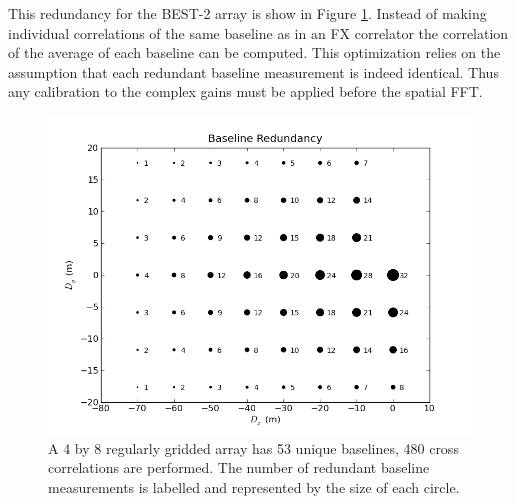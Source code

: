 \documentclass[useAMS,macros,usenatbib]{mn2e}
\begin{document}
This redundancy for the BEST-2 array is show in Figure \ref{fig:redbl}.
Instead of making individual correlations of the same baseline as in an FX correlator the correlation of the average of each baseline can be computed.
This optimization relies on the assumption that each redundant baseline measurement is indeed identical.
Thus any calibration to the complex gains must be applied before the spatial FFT.

\begin{figure}
    \centering
    \includegraphics[width=\linewidth]{graphics/redbl.png}
    \caption{A 4 by 8 regularly gridded array has 53 unique baselines, 480 cross correlations are performed. The number of redundant baseline measurements is labelled and represented by the size of each circle.}
    \label{fig:redbl}
\end{figure}
\end{document}
